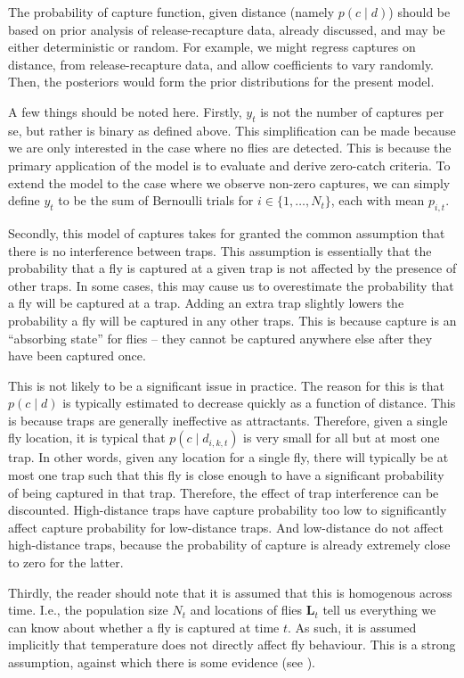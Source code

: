 \documentclass[
  oneside]{book}
\begin{document}
The probability of capture function, given distance (namely \(p(c \mid d)\)) should be based on prior analysis of release-recapture data, already discussed, and may be either deterministic or random. For example, we might regress captures on distance, from release-recapture data, and allow coefficients to vary randomly. Then, the posteriors would form the prior distributions for the present model.

A few things should be noted here. Firstly, \(y_t\) is not the number of captures per se, but rather is binary as defined above. This simplification can be made because we are only interested in the case where no flies are detected. This is because the primary application of the model is to evaluate and derive zero-catch criteria. To extend the model to the case where we observe non-zero captures, we can simply define \(y_t\) to be the sum of Bernoulli trials for \(i \in \{1, \ldots, N_t\}\), each with mean \(p_{i,t}\).

Secondly, this model of captures takes for granted the common assumption that there is no interference between traps. This assumption is essentially that the probability that a fly is captured at a given trap is not affected by the presence of other traps. In some cases, this may cause us to overestimate the probability that a fly will be captured at a trap. Adding an extra trap slightly lowers the probability a fly will be captured in any other traps. This is because capture is an ``absorbing state'' for flies -- they cannot be captured anywhere else after they have been captured once.

This is not likely to be a significant issue in practice. The reason for this is that \(p(c \mid d)\) is typically estimated to decrease quickly as a function of distance. This is because traps are generally ineffective as attractants. Therefore, given a single fly location, it is typical that \(p(c \mid d_{i, k, t})\) is very small for all but at most one trap. In other words, given any location for a single fly, there will typically be at most one trap such that this fly is close enough to have a significant probability of being captured in that trap. Therefore, the effect of trap interference can be discounted. High-distance traps have capture probability too low to significantly affect capture probability for low-distance traps. And low-distance do not affect high-distance traps, because the probability of capture is already extremely close to zero for the latter.

Thirdly, the reader should note that it is assumed that this is homogenous across time. I.e., the population size \(N_t\) and locations of flies \(\mathbf L_t\) tell us everything we can know about whether a fly is captured at time \(t\). As such, it is assumed implicitly that temperature does not directly affect fly behaviour. This is a strong assumption, against which there is some evidence (see \citet{bali2021}).
\end{document}
